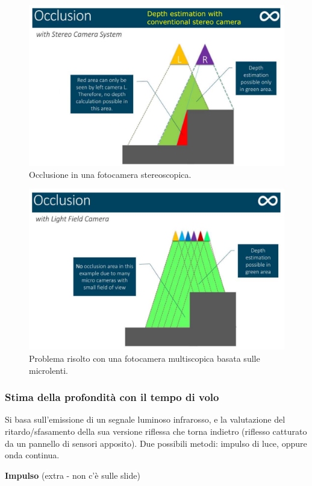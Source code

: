\documentclass[a4paper,11pt]{article}
\begin{document}
\renewcommand{\thefigure}{3.28}
\begin{figure}[!h]
  \centering
    \includegraphics[scale=0.4]{images/3/stereo.png}
    \caption{Occlusione in una fotocamera stereoscopica.}
\end{figure}

\renewcommand{\thefigure}{3.29}
\begin{figure}[!h]
  \centering
    \includegraphics[scale=0.4]{images/3/multi.png}
    \caption{Problema risolto con una fotocamera multiscopica basata sulle microlenti.}
\end{figure}

\newpage
\subsubsection{Stima della profondità con il tempo di volo}
Si basa sull'emissione di un segnale luminoso infrarosso, e la valutazione del ritardo/sfasamento della sua versione riflessa che torna indietro (riflesso catturato da un pannello di sensori
apposito). Due possibili metodi: impulso di luce, oppure onda continua.
\par
\textbf{Impulso} (extra - non c'è sulle slide)
\end{document}
